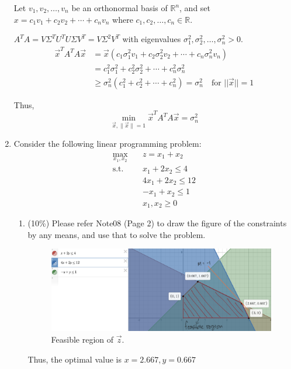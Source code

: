 \documentclass[a4paper,10pt]{article}
\begin{document}
\begin{enumerate}
{\color{blue}
    Let $v_1, v_2, \ldots, v_n$ be an orthonormal basis of $\mathbb{R}^n$, 
    and set $x = c_1v_1 + c_2v_2 + \cdots + c_n v_n$ where $c_1, c_2, \ldots, c_n \in \mathbb{R}$.

    $A^T A = V \Sigma^T U^T U \Sigma V^T = V \Sigma^2 V^T$ with eigenvalues $\sigma_1^2, \sigma_2^2, \ldots, \sigma_n^2 > 0$.
    \begin{align}
        \vec{x}^T A^T A \vec{x} &= \vec{x} (c_1 \sigma_1^2 v_1 + c_2 \sigma_2^2 v_2 + \cdots + c_n \sigma_n^2 v_n) \\
        &= c_1^2 \sigma_1^2 + c_2^2 \sigma_2^2 + \cdots + c_n^2 \sigma_n^2 \\
        &\geq \sigma_n^2(c_1^2 + c_2^2 + \cdots + c_n^2) = \sigma_n^2 \quad \text{for } ||\vec{x}|| = 1
    \end{align}

    Thus,
    \[
        \min_{\vec{x}, \|\vec{x}\|=1} \vec{x}^T A^T A \vec{x} = \sigma_n^2
    \]
}

\item Consider the following linear programming problem:
    \begin{equation}
        \begin{aligned}
            \max_{x_1,x_2} \quad & z=x_1+x_2 \\
            \textrm{s.t.} \quad & x_1 + 2x_2 \le 4  \\
                \quad& 4x_1 + 2x_2 \le 12   \\
                \quad& -x_1 + x_2 \le 1   \\
                \quad& x_1, x_2 \ge 0
        \end{aligned}
    \end{equation}

    \begin{enumerate}
        \item (10\%) Please refer Note08 (Page 2) to draw the figure of the constraints by any means, and use that to solve the problem. 
        \begin{figure}[H]
            \centering
            \includegraphics[scale=0.15]{./4a.png}
            \caption{Feasible region of $\vec{z}$.}
        \end{figure}
        {\color{blue}
            Thus, the optimal value is $x = 2.667, y = 0.667$
        }


\end{enumerate}
\end{enumerate}
\end{document}
